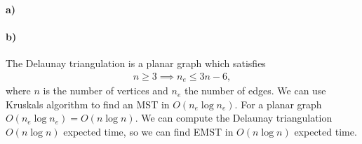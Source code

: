 \documentclass[10pt,a4paper,final,oneside,openany,article,oldfontcommands]{memoir}
\begin{document}
\paragraph{a)}


\paragraph{b)}
The Delaunay triangulation is a planar graph which satisfies
\begin{align*}
  n \ge 3 \implies n_e \le 3n - 6,
\end{align*}
where $n$ is the number of vertices and $n_e$ the number of edges. We can use Kruskals algorithm to find an MST in $O(n_e \log n_e)$. For a planar graph $O(n_e \log n_e) = O(n \log n)$. We can compute the Delaunay triangulation $O(n \log n)$ expected time, so we can find EMST in $O(n \log n)$ expected time.

\printbibliography
\end{document}
